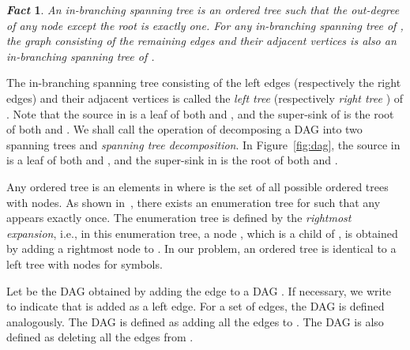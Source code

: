 \documentclass[10pt]{llncs}
\newtheorem{fact}{{\em Fact}}
\begin{document}
\begin{fact}
An in-branching spanning tree is an ordered tree such that the out-degree of any node 
except the root is exactly one. 
For any in-branching spanning tree of , the graph consisting of the
remaining edges and their adjacent vertices is also an in-branching spanning tree of .
\end{fact}

The in-branching spanning tree consisting of the left edges (respectively the right edges) and their adjacent vertices is called the
{\em left tree}  (respectively {\em right tree} ) of .
Note that the source in  is a leaf of both  and , and
the super-sink of  is the root of both  and .
We shall call the operation of decomposing a DAG  into two spanning trees  and  
{\em spanning tree decomposition}. 
In Figure~\ref{fig:dag}, the source  in  is a leaf of both  and , and 
the super-sink  in  is the root of both  and .

Any ordered tree is an elements in 
where  is the set of all possible ordered trees with  nodes.
As shown in~\cite{Asai2002,Zaki2002}, 
there exists an enumeration tree for  such that
any  appears exactly once. 
The enumeration tree is defined by the {\em rightmost expansion}, i.e.,
in this enumeration tree, a node , 
which is a child of , is obtained by adding a rightmost node to .
In our problem, an ordered tree  is 
identical to a left tree  with  nodes for  symbols.

Let  be the DAG obtained by adding the edge  to a DAG .
If necessary, we write  to indicate that
 is added as a left edge.
For a set  of edges, the DAG  is defined analogously.
The DAG  is defined as adding all the edges  to .
The DAG  is also defined as deleting all the edges  from .
\end{document}
